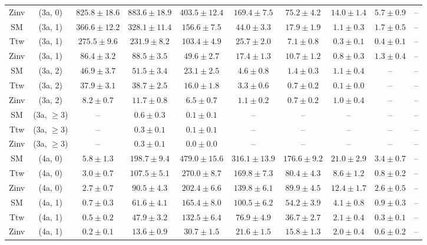\begin{table}[h!]
{\begin{tabular}{cccccccccc}
	Zinv & (3a, 0) & $825.8\pm 18.6$ & $883.6\pm 18.9$ & $403.5\pm 12.4$ & $169.4\pm 7.5$ & $75.2\pm 4.2$ & $14.0\pm 1.4$ & $5.7\pm 0.9$ & -- \\[0.5ex] 
	SM & (3a, 1) & $366.6\pm 12.2$ & $328.1\pm 11.4$ & $156.6\pm 7.5$ & $44.0\pm 3.3$ & $17.9\pm 1.9$ & $1.1\pm 0.3$ & $1.7\pm 0.5$ & -- \\[0.5ex] 
	Ttw & (3a, 1) & $275.5\pm 9.6$ & $231.9\pm 8.2$ & $103.4\pm 4.9$ & $25.7\pm 2.0$ & $7.1\pm 0.8$ & $0.3\pm 0.1$ & $0.4\pm 0.1$ & -- \\[0.5ex] 
	Zinv & (3a, 1) & $86.4\pm 3.2$ & $88.5\pm 3.5$ & $49.6\pm 2.7$ & $17.4\pm 1.3$ & $10.7\pm 1.2$ & $0.8\pm 0.3$ & $1.3\pm 0.4$ & -- \\[0.5ex] 
	SM & (3a, 2) & $46.9\pm 3.7$ & $51.5\pm 3.4$ & $23.1\pm 2.5$ & $4.6\pm 0.8$ & $1.4\pm 0.3$ & $1.1\pm 0.4$ & -- & -- \\[0.5ex] 
	Ttw & (3a, 2) & $37.9\pm 3.1$ & $38.7\pm 2.5$ & $16.0\pm 1.8$ & $3.3\pm 0.6$ & $0.7\pm 0.2$ & $0.1\pm 0.0$ & -- & -- \\[0.5ex] 
	Zinv & (3a, 2) & $8.2\pm 0.7$ & $11.7\pm 0.8$ & $6.5\pm 0.7$ & $1.1\pm 0.2$ & $0.7\pm 0.2$ & $1.0\pm 0.4$ & -- & -- \\[0.5ex] 
	SM & (3a, $\ge3$) & -- & $0.6\pm 0.3$ & $0.1\pm 0.1$ & -- & -- & -- & -- & -- \\[0.5ex] 
	Ttw & (3a, $\ge3$) & -- & $0.3\pm 0.1$ & $0.1\pm 0.1$ & -- & -- & -- & -- & -- \\[0.5ex] 
	Zinv & (3a, $\ge3$) & -- & $0.3\pm 0.1$ & $0.0\pm 0.0$ & -- & -- & -- & -- & -- \\[0.5ex] 
	SM & (4a, 0) & $5.8\pm 1.3$ & $198.7\pm 9.4$ & $479.0\pm 15.6$ & $316.1\pm 13.9$ & $176.6\pm 9.2$ & $21.0\pm 2.9$ & $3.4\pm 0.7$ & -- \\[0.5ex] 
	Ttw & (4a, 0) & $3.0\pm 0.7$ & $107.5\pm 5.1$ & $270.0\pm 8.7$ & $169.8\pm 7.3$ & $80.4\pm 4.3$ & $8.6\pm 1.2$ & $0.8\pm 0.2$ & -- \\[0.5ex] 
	Zinv & (4a, 0) & $2.7\pm 0.7$ & $90.5\pm 4.3$ & $202.4\pm 6.6$ & $139.8\pm 6.1$ & $89.9\pm 4.5$ & $12.4\pm 1.7$ & $2.6\pm 0.5$ & -- \\[0.5ex] 
	SM & (4a, 1) & $0.7\pm 0.3$ & $61.6\pm 4.1$ & $165.4\pm 8.0$ & $100.5\pm 6.2$ & $54.2\pm 3.9$ & $4.1\pm 0.8$ & $0.9\pm 0.3$ & -- \\[0.5ex] 
	Ttw & (4a, 1) & $0.5\pm 0.2$ & $47.9\pm 3.2$ & $132.5\pm 6.4$ & $76.9\pm 4.9$ & $36.7\pm 2.7$ & $2.1\pm 0.4$ & $0.3\pm 0.1$ & -- \\[0.5ex] 
	Zinv & (4a, 1) & $0.2\pm 0.1$ & $13.6\pm 0.9$ & $30.7\pm 1.5$ & $21.6\pm 1.5$ & $15.8\pm 1.3$ & $2.0\pm 0.4$ & $0.6\pm 0.2$ & -- \\[0.5ex] 

\end{tabular}}
\end{table}
